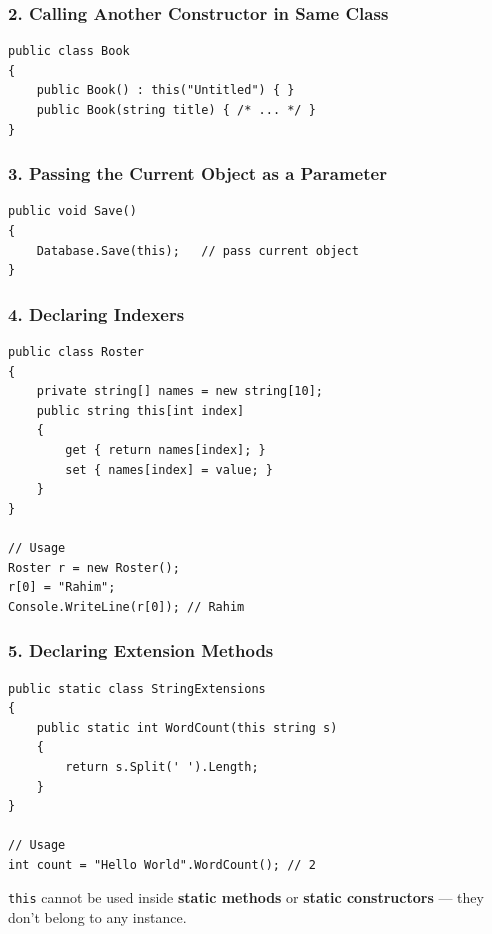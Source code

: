 \documentclass[11pt,a4paper]{article}
\begin{document}
\subsubsection{2. Calling Another Constructor in Same Class}

\begin{lstlisting}
public class Book
{
    public Book() : this("Untitled") { }
    public Book(string title) { /* ... */ }
}
\end{lstlisting}

\subsubsection{3. Passing the Current Object as a Parameter}

\begin{lstlisting}
public void Save()
{
    Database.Save(this);   // pass current object
}
\end{lstlisting}

\subsubsection{4. Declaring Indexers}

\begin{lstlisting}
public class Roster
{
    private string[] names = new string[10];
    public string this[int index]
    {
        get { return names[index]; }
        set { names[index] = value; }
    }
}

// Usage
Roster r = new Roster();
r[0] = "Rahim";
Console.WriteLine(r[0]); // Rahim
\end{lstlisting}

\subsubsection{5. Declaring Extension Methods}

\begin{lstlisting}
public static class StringExtensions
{
    public static int WordCount(this string s)
    {
        return s.Split(' ').Length;
    }
}

// Usage
int count = "Hello World".WordCount(); // 2
\end{lstlisting}

\begin{gotchaBox}
\texttt{this} cannot be used inside \textbf{static methods} or \textbf{static constructors} — they don't belong to any instance.
\end{gotchaBox}
\end{document}
